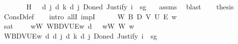 \begin{isabellebody}
%
\isadelimproof
%
\endisadelimproof
%
\isatagproof
{}\isamarkupfalse%
\ {\isacharminus}{\kern0pt}\isanewline
\ \ \isamarkupfalse%
\ {\isasymDelta}\ \ H{\isacharcolon}{\kern0pt}\ {\isachardoublequoteopen}{\isasymGamma}\ {\isasymTurnstile}\ {\isasymD}\isactrlsup d\ j\ {\isacharparenleft}{\kern0pt}{\isasymB}\isactrlsup d\ k\ {\isacharparenleft}{\kern0pt}{\isasymD}\isactrlsup d\ j\ {\isacharparenleft}{\kern0pt}Done\isactrlsup d\ {\isacharparenleft}{\kern0pt}Justify\ i\ {\isasymDelta}\ sg\ {\isasymphi}{\isacharparenright}{\kern0pt}{\isacharparenright}{\kern0pt}{\isacharparenright}{\kern0pt}{\isacharparenright}{\kern0pt}{\isachardoublequoteclose}\ \isamarkupfalse%
\ assms\ \isamarkupfalse%
\ blast\isanewline
\ \ \isamarkupfalse%
\ {\isacharquery}{\kern0pt}thesis\ \isamarkupfalse%
\ ConsD{\isacharunderscore}{\kern0pt}def\isanewline
\ \ \isamarkupfalse%
\ {\isacharparenleft}{\kern0pt}intro\ allI\ impI{\isacharparenright}{\kern0pt}\isanewline
\ \ \ \ \isamarkupfalse%
\ W\ B\ D\ V\ U\ E\ w\isanewline
\ \ \ \ \isamarkupfalse%
\ sat{\isacharcolon}{\kern0pt}\ {\isachardoublequoteopen}{\isasymforall}{\isasymgamma}{\isachardot}{\kern0pt}\ {\isasymGamma}\ {\isasymgamma}\ {\isasymlongrightarrow}\ {\isacharparenleft}{\kern0pt}{\isasymforall}w{\isacharcolon}{\kern0pt}W{\isachardot}{\kern0pt}\ {\isasymlangle}W{\isacharcomma}{\kern0pt}B{\isacharcomma}{\kern0pt}D{\isacharcomma}{\kern0pt}V{\isacharcomma}{\kern0pt}U{\isacharcomma}{\kern0pt}E{\isasymrangle}{\isacharcomma}{\kern0pt}w\ {\isasymTurnstile}\isactrlsup d\ {\isasymgamma}{\isacharparenright}{\kern0pt}{\isachardoublequoteclose}\ \ wW{\isacharcolon}{\kern0pt}\ {\isachardoublequoteopen}W\ w{\isachardoublequoteclose}\isanewline
\ \ \ \ \isamarkupfalse%
\ {\isachardoublequoteopen}{\isasymlangle}W{\isacharcomma}{\kern0pt}B{\isacharcomma}{\kern0pt}D{\isacharcomma}{\kern0pt}V{\isacharcomma}{\kern0pt}U{\isacharcomma}{\kern0pt}E{\isasymrangle}{\isacharcomma}{\kern0pt}w\ {\isasymTurnstile}\isactrlsup d\ {\isasymD}\isactrlsup d\ j\ {\isacharparenleft}{\kern0pt}{\isasymB}\isactrlsup d\ k\ {\isacharparenleft}{\kern0pt}{\isasymD}\isactrlsup d\ j\ {\isacharparenleft}{\kern0pt}Done\isactrlsup d\ {\isacharparenleft}{\kern0pt}Justify\ i\ {\isasymDelta}\ sg\ {\isasymphi}{\isacharparenright}{\kern0pt}{\isacharparenright}{\kern0pt}{\isacharparenright}{\kern0pt}{\isacharparenright}{\kern0pt}{\isachardoublequoteclose}\isanewline

\end{isabellebody}
